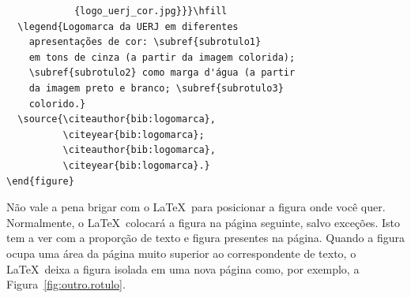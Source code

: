 \begin{verbatim}
            {logo_uerj_cor.jpg}}}\hfill
  \legend{Logomarca da UERJ em diferentes 
    apresentações de cor: \subref{subrotulo1} 
    em tons de cinza (a partir da imagem colorida);
    \subref{subrotulo2} como marga d'água (a partir 
    da imagem preto e branco; \subref{subrotulo3} 
    colorido.}
  \source{\citeauthor{bib:logomarca}, 
          \citeyear{bib:logomarca}; 
          \citeauthor{bib:logomarca}, 
          \citeyear{bib:logomarca}.}
\end{figure}
\end{verbatim}

Não vale a pena brigar com o \LaTeX\ para posicionar a figura onde você quer. Normalmente, o \LaTeX\ colocará a figura na página seguinte, salvo exceções. Isto tem  a ver com a proporção de texto e figura presentes na página. Quando a figura ocupa uma área da página muito superior ao correspondente de texto, o \LaTeX\ deixa a figura isolada em uma nova página como, por exemplo, a Figura~\ref{fig:outro.rotulo}.

